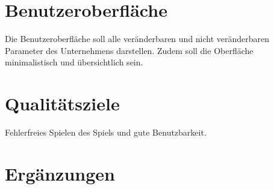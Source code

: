 \section{Benutzeroberfläche}
Die Benutzeroberfläche soll alle veränderbaren und nicht veränderbaren Parameter des Unternehmens darstellen. Zudem soll die Oberfläche minimalistisch und übersichtlich sein. 

\section{Qualitätsziele}
Fehlerfreies Spielen des Spiels und gute Benutzbarkeit.

\section{Ergänzungen}

